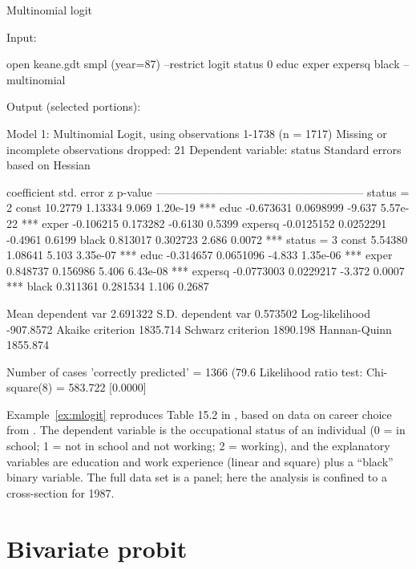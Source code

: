 \begin{script}[htbp]
  \caption{Multinomial logit}
  \label{ex:mlogit}
Input:
\begin{scodebit}
open keane.gdt
smpl (year=87) --restrict
logit status 0 educ exper expersq black --multinomial
\end{scodebit}
Output (selected portions):
\begin{scodebit}
Model 1: Multinomial Logit, using observations 1-1738 (n = 1717)
Missing or incomplete observations dropped: 21
Dependent variable: status
Standard errors based on Hessian

             coefficient   std. error      z      p-value 
  --------------------------------------------------------
  status = 2
  const      10.2779       1.13334       9.069    1.20e-19 ***
  educ       -0.673631     0.0698999    -9.637    5.57e-22 ***
  exper      -0.106215     0.173282     -0.6130   0.5399  
  expersq    -0.0125152    0.0252291    -0.4961   0.6199  
  black       0.813017     0.302723      2.686    0.0072   ***
  status = 3
  const       5.54380      1.08641       5.103    3.35e-07 ***
  educ       -0.314657     0.0651096    -4.833    1.35e-06 ***
  exper       0.848737     0.156986      5.406    6.43e-08 ***
  expersq    -0.0773003    0.0229217    -3.372    0.0007   ***
  black       0.311361     0.281534      1.106    0.2687  

Mean dependent var   2.691322   S.D. dependent var   0.573502
Log-likelihood      -907.8572   Akaike criterion     1835.714
Schwarz criterion    1890.198   Hannan-Quinn         1855.874

Number of cases 'correctly predicted' = 1366 (79.6%
Likelihood ratio test: Chi-square(8) = 583.722 [0.0000]  
\end{scodebit}
\end{script}

Example~\ref{ex:mlogit} reproduces Table 15.2 in
\cite{wooldridge-panel}, based on data on career choice from
\cite{keane97}.  The dependent variable is the occupational status of
an individual (0 = in school; 1 = not in school and not working; 2 =
working), and the explanatory variables are education and work
experience (linear and square) plus a ``black'' binary variable.  The
full data set is a panel; here the analysis is confined to a
cross-section for 1987. 

\section{Bivariate probit}
\label{sec:biprobit}

